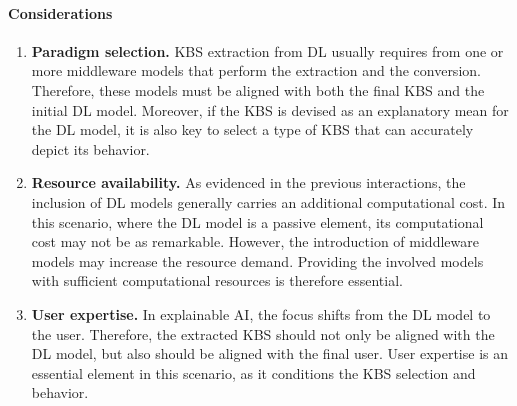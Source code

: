 \paragraph{Considerations}
\begin{enumerate} [start=1,label={\bfseries C\arabic*.}]
    \item \textbf{Paradigm selection.} \label{kbsextradl_C_paradigm} KBS extraction from DL usually requires from one or more middleware models that perform the extraction and the conversion. Therefore, these models must be aligned with both the final KBS and the initial DL model. Moreover, if the KBS is devised as an explanatory mean for the DL model, it is also key to select a type of KBS that can accurately depict its behavior.
    
    \item \textbf{Resource availability.} \label{kbsextradl_C_resource} As evidenced in the previous interactions, the inclusion of DL models generally carries an additional computational cost. In this scenario, where the DL model is a passive element, its computational cost may not be as remarkable. However, the introduction of middleware models may increase the resource demand. Providing the involved models with sufficient computational resources is therefore essential.
    
    \item \textbf{User expertise.} \label{kbsextradl_C_user} In explainable AI, the focus shifts from the DL model to the user. Therefore, the extracted KBS should not only be aligned with the DL model, but also should be aligned with the final user. User expertise is an essential element in this scenario, as it conditions the KBS selection and behavior.
\end{enumerate}

